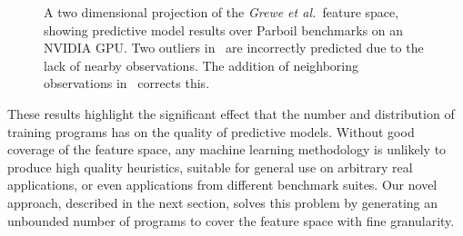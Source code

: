 \begin{figure}
  \caption{A two dimensional projection of the \emph{Grewe et al.\ }feature space, showing predictive model results over Parboil benchmarks on an NVIDIA GPU. Two outliers in~\protect{} are incorrectly predicted due to the lack of nearby observations. The addition of neighboring observations in~\protect{} corrects this.}%
  \label{fig:pca-benchmarks}
\end{figure}

These results highlight the significant effect that the number and distribution of training programs has on the quality of predictive models. Without good coverage of the feature space, any machine learning methodology is unlikely to produce high quality heuristics, suitable for general use on arbitrary real applications, or even applications from different benchmark suites. Our novel approach, described in the next section, solves this problem by generating an unbounded number of programs to cover the feature space with fine granularity.
